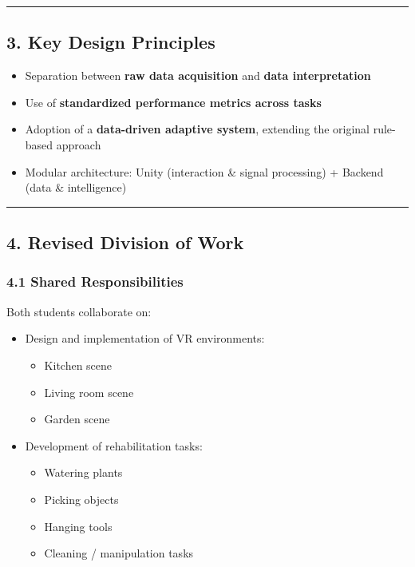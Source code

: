 \documentclass[11pt]{article}
\begin{document}
\hrule


\subsection*{3. Key Design Principles}


\begin{itemize}
\item Separation between \textbf{raw data acquisition} and \textbf{data interpretation}
\item Use of \textbf{standardized performance metrics across tasks}
\item Adoption of a \textbf{data-driven adaptive system}, extending the original rule-based approach
\item Modular architecture: Unity (interaction \& signal processing) + Backend (data \& intelligence)
\end{itemize}

\hrule


\subsection*{4. Revised Division of Work}


\subsubsection*{4.1 Shared Responsibilities}


Both students collaborate on:


\begin{itemize}
\item Design and implementation of VR environments:
\begin{itemize}
\item Kitchen scene
\item Living room scene
\item Garden scene
\end{itemize}
\end{itemize}

\begin{itemize}
\item Development of rehabilitation tasks:
\begin{itemize}
\item Watering plants
\item Picking objects
\item Hanging tools
\item Cleaning / manipulation tasks
\end{itemize}
\end{itemize}
\end{document}

